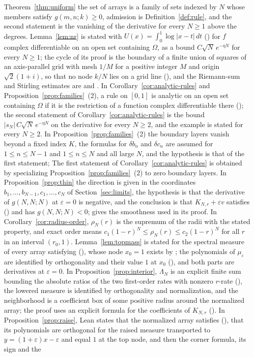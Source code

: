 \documentclass[twoside,10pt]{article}
\numberwithin{equation}{section}
\theoremstyle{slbody}
\theoremstyle{definition}
\theoremstyle{remark}
\renewcommand{\eqref}[1]{\textup{{\normalfont(\oldstylenums{\ref{#1}}}\normalfont)}}
\begin{document}
Theorem~\ref{thm:uniform} the set of arrays is a family of sets indexed by $N$ whose members satisfy $g(m,n;k)\geq0$, admission is Definition~\ref{def:rule}, and the second statement is the vanishing of the derivative for every $N\geq1$ above the degrees. Lemma~\ref{lem:nr} is stated with $U(x)=\int_0^1\log|x-t|\,dt$ () for $f$ complex differentiable on an open set containing $\Omega$, as a bound $C\sqrt N\,e^{-\eta N}$ for every $N\geq1$; the cycle of its proof is the boundary of a finite union of squares of an axis-parallel grid with mesh $1/M$ for a positive integer $M$ and origin $\sqrt2(1+i)$, so that no node $k/N$ lies on a grid line (), and the Riemann-sum and Stirling estimates are  and . In Corollary~\ref{cor:analytic-rules} and Proposition~\ref{prop:families}~(2), a rule on $[0,1]$ is analytic on an open set containing $\Omega$ if it is the restriction of a function complex differentiable there (); the second statement of Corollary~\ref{cor:analytic-rules} is the bound $|s_N|\,C\sqrt N\,e^{-\eta N}$ on the derivative for every $N\geq2$, and the example is stated for every $N\geq2$. In Proposition~\ref{prop:families}~(2) the boundary layers vanish beyond a fixed index $K$, the formulas for $\delta b_n$ and $\delta c_n$ are assumed for $1\leq n\leq N-1$ and $1\leq n\leq N$ and all large $N$, and the hypothesis is that of the first statement; The first statement of Corollary~\ref{cor:analytic-rules} is obtained by specializing Proposition~\ref{prop:families}~(2) to zero boundary layers. In Proposition~\ref{prop:thin} the direction is given in the coordinates $b_1,\ldots,b_{N-1},c_1,\ldots,c_N$ of Section~\ref{sec:limits}, the hypothesis is that the derivative of $g(N,N;N)$ at $\varepsilon=0$ is negative, and the conclusion is that $K_{N,r}+\varepsilon v$ satisfies \eqref{eq:basic} and has $g(N,N;N)<0$;  gives the smoothness used in its proof. In Corollary~\ref{cor:radius-order}, $\rho_N(r)$ is the supremum of the radii with the stated property, and exact order means $c_1(1-r)^N\leq\rho_N(r)\leq c_2(1-r)^N$ for all $r$ in an interval $(r_0,1)$. Lemma~\ref{lem:topmass} is stated for the spectral measure of every array satisfying \eqref{eq:basic}, whose node $x_0=1$ exists by ; the polynomials of $\mu_\varepsilon$ are identified by orthogonality and their value $1$ at $x_0$ (), and both parts are derivatives at $\varepsilon=0$. In Proposition~\ref{prop:interior}, $\Lambda_N$ is an explicit finite sum bounding the absolute ratios of the two first-order rates with nonzero $r$-rate (), the lowered measure is identified by orthogonality and normalization, and the neighborhood is a coefficient box of some positive radius around the normalized array; the proof uses an explicit formula for the coefficients of $K_{N,r}$ (). In Proposition~\ref{prop:raise}, Lean states that the normalized array satisfies \eqref{eq:basic}, that its polynomials are orthogonal for the raised measure transported to $y=(1+\varepsilon)x-\varepsilon$ and equal $1$ at the top node, and then the corner formula, its sign and the 
\end{document}
